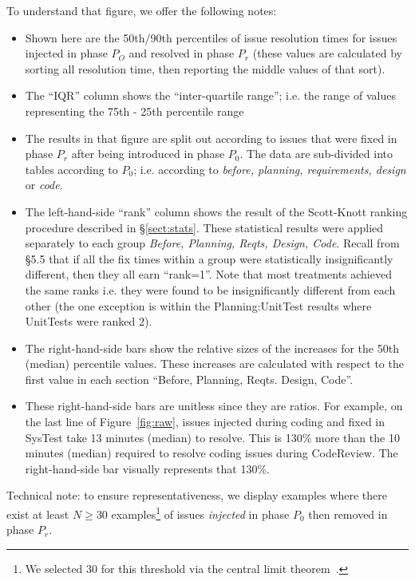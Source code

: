 \documentclass[smallcondensed]{svjour3}
\newcommand{\bi}{\begin{itemize}}%
\newcommand{\ei}{\end{itemize}}
\newcommand{\tion}[1]{\S\ref{sect:#1}}
\newcommand{\fig}[1]{Figure~\ref{fig:#1}}
\begin{document}
To understand that figure, we offer the following notes:
\bi
\item
Shown here are the 50th/90th percentiles of issue resolution times for issues injected in phase $P_O$ and resolved in phase $P_r$ (these values are calculated
by sorting all resolution time, then reporting the middle values of that sort).
\item
The ``IQR'' column shows the ``inter-quartile range''; i.e. the range of values representing the 75th - 25th percentile range
\item
The results in that figure are  split out according to issues that were fixed in phase $P_r$ after
being introduced in phase $P_0$. The data are sub-divided into tables according to $P_0$;
i.e. according to {\em before, planning, requirements, design} or {\em  code}. 
\item
The left-hand-side ``rank'' column shows the result of the Scott-Knott ranking procedure described in \tion{stats}. These statistical results were applied separately
to each group {\em Before, Planning, Reqts, Design, Code}.
Recall from \S5.5 that if all the fix times within a group
were statistically insignificantly different, then they all earn ``rank=1''.
Note that
most treatments achieved the same ranks i.e. they were found to be insignificantly different  from each other (the one exception is  within the  Planning:UnitTest results 
where UnitTests were ranked 2).
\item
The right-hand-side bars
show the relative sizes of the increases for the  50th (median)   percentile values. These increases are calculated with respect to the first value in each section ``Before, Planning, Reqts. Design, Code''.
\item
These right-hand-side bars are unitless since they are ratios. For example,
on the last line of \fig{raw}, issues injected during coding and fixed in SysTest take 13 minutes (median) to resolve. This is 130\% more than the 10 minutes (median) required
to resolve coding issues during CodeReview. The right-hand-side bar visually represents that 130\%.
\ei
Technical note: to ensure   representativeness, we display examples
where there exist at least $N\ge 30$ examples\footnote{We selected 30
for this threshold via the central limit theorem~\cite{maxwelldata}.} of issues {\em injected} in phase $P_0$ then
removed in phase $P_r$.
\end{document}
